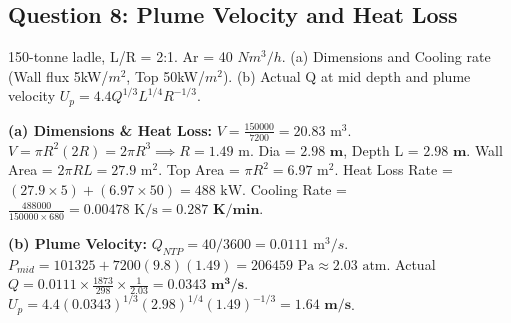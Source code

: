 \documentclass[11pt,a4paper]{article}
\begin{document}
\subsection{Question 8: Plume Velocity and Heat Loss}
\begin{questionbox}
150-tonne ladle, L/R = 2:1. Ar = 40 $Nm^3/h$.
(a) Dimensions and Cooling rate (Wall flux 5kW/$m^2$, Top 50kW/$m^2$).
(b) Actual Q at mid depth and plume velocity $U_p = 4.4 Q^{1/3} L^{1/4} R^{-1/3}$.
\end{questionbox}
\begin{solutionbox}
\textbf{(a) Dimensions \& Heat Loss:}
$V = \frac{150000}{7200} = 20.83 \text{ m}^3$. $V = \pi R^2 (2R) = 2\pi R^3 \implies R = 1.49 \text{ m}$.
Dia = $\mathbf{2.98 \text{ m}}$, Depth L = $\mathbf{2.98 \text{ m}}$.
Wall Area = $2\pi R L = 27.9 \text{ m}^2$. Top Area = $\pi R^2 = 6.97 \text{ m}^2$.
Heat Loss Rate = $(27.9 \times 5) + (6.97 \times 50) = 488 \text{ kW}$.
Cooling Rate = $\frac{488000}{150000 \times 680} = 0.00478 \text{ K/s} = \mathbf{0.287 \text{ K/min}}$.

\textbf{(b) Plume Velocity:}
$Q_{NTP} = 40/3600 = 0.0111 \text{ m}^3/s$.
$P_{mid} = 101325 + 7200(9.8)(1.49) = 206459 \text{ Pa} \approx 2.03 \text{ atm}$.
Actual $Q = 0.0111 \times \frac{1873}{298} \times \frac{1}{2.03} = \mathbf{0.0343 \text{ m}^3/s}$.
$U_p = 4.4(0.0343)^{1/3}(2.98)^{1/4}(1.49)^{-1/3} = \mathbf{1.64 \text{ m/s}}$.
\end{solutionbox}
\end{document}
